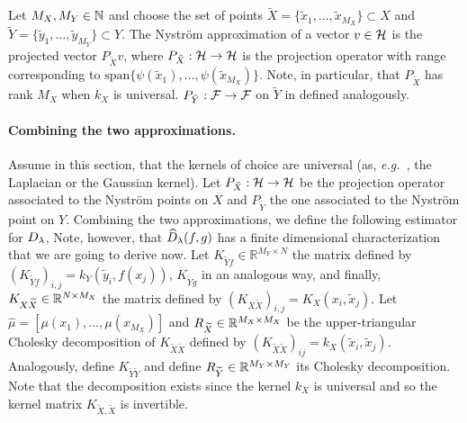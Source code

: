 Let $M_X, M_Y \in \mathbb N$ and choose the set of points $\widetilde{X} = \lbrace \widetilde x_1, \ldots, \widetilde x_{M_X}\rbrace \subset X$ and $\widetilde{Y} = \lbrace \widetilde y_1, \ldots, \widetilde y_{M_Y} \} \subset Y$. The Nystr\"om approximation of a vector $v \in \mathcal H$ is the projected vector $P_{\tilde{X}} v$, where $P_{\tilde{X}} :\mathcal H \to \mathcal H$ is the projection operator with range corresponding to $\textrm{span} \{\psi(\tilde{x}_1),\dots,\psi(\tilde{x}_{M_X})\}$. Note, in particular, that $P_{\tilde{X}}$ has rank $M_X$ when $k_X$ is universal. $P_{\tilde{Y}}: {\cal F} \to {\cal F}$ on $\tilde{Y}$ in defined analogously.


\paragraph{Combining the two approximations.}
Assume in this section, that the kernels of choice are universal (as, \emph{e.g.\ }, the Laplacian or the Gaussian kernel).
Let $P_{\tilde{X}}:\mathcal H \to \mathcal H$ be the projection operator associated to the Nystr\"om points on $X$ and $P_{\tilde{Y}}$ the one associated to the Nystr\"om point on $Y$. Combining the two approximations, we define the following estimator for $D_\lambda$,
Note, however, that $\widehat{D}_\lambda(f,g)$ has a finite dimensional characterization that we are going to derive now.
Let $K_{\widetilde Y f} \in \mathbb R^{M_Y \times N}$ the matrix defined by $(K_{\widetilde Y f})_{i, j} = k_Y(\widetilde y_i, f(x_j))$, $K_{\widetilde Y g}$ in an analogous way, and finally, $K_{X \widetilde X}\in\mathbb R^{N \times M_X}$ the matrix defined by $(K_{X\widetilde X})_{i, j} = K_X(x_i, \widetilde x_j)$. Let $\widehat \mu = \left[ \mu(x_1), \ldots, \mu(x_{M_X})\right]$ and $R_{\widetilde X} \in\mathbb R^{M_X \times M_X}$ be the upper-triangular Cholesky decomposition of $K_{\widetilde X \widetilde X}$ defined by $(K_{\widetilde X \widetilde X})_{ij} = k_X(\widetilde x_i, \widetilde x_j)$. Analogously, define $K_{\widetilde Y \widetilde Y}$ and define $R_{\widetilde Y}\in\mathbb R^{M_Y \times M_Y}$ its Cholesky decomposition. Note that the decomposition exists since the kernel $k_X$ is universal and so the kernel matrix $K_{\tilde{X},\tilde{X}}$ is invertible.


